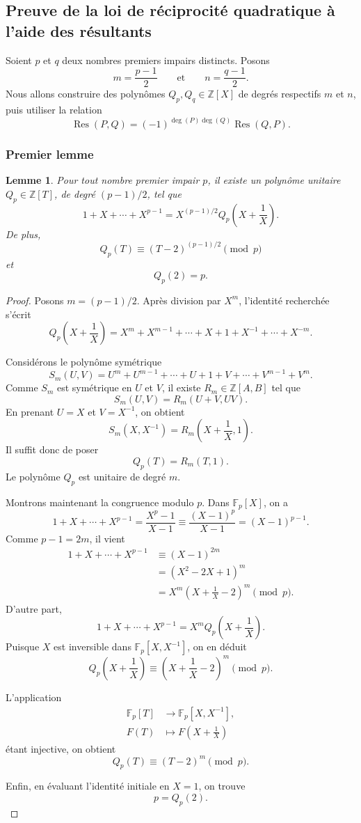 \documentclass[11pt,a4paper]{article}
\newtheorem{lemma}{Lemme}
\newcommand{\Res}{\operatorname{Res}}
\begin{document}
\subsection{Preuve de la loi de réciprocité quadratique à l'aide des résultants}

Soient \(p\) et \(q\) deux nombres premiers impairs distincts. Posons
\[
m=\frac{p-1}{2}
\qquad\text{et}\qquad
n=\frac{q-1}{2}.
\]
Nous allons construire des polynômes \(Q_p,Q_q\in\mathbb{Z}[X]\) de degrés
respectifs \(m\) et \(n\), puis utiliser la relation
\[
\Res(P,Q)
=
(-1)^{\deg(P)\deg(Q)}\Res(Q,P).
\]

\subsubsection{Premier lemme}

\begin{lemma}
Pour tout nombre premier impair \(p\), il existe un polynôme unitaire
\(Q_p\in\mathbb{Z}[T]\), de degré \((p-1)/2\), tel que
\[
1+X+\cdots+X^{p-1}
=
X^{(p-1)/2}Q_p\left(X+\frac{1}{X}\right).
\]
De plus,
\[
Q_p(T)\equiv (T-2)^{(p-1)/2}\pmod p
\]
et
\[
Q_p(2)=p.
\]
\end{lemma}

\begin{proof}
Posons \(m=(p-1)/2\). Après division par \(X^m\), l'identité recherchée
s'écrit
\[
Q_p\left(X+\frac{1}{X}\right)
=
X^m+X^{m-1}+\cdots+X+1
+X^{-1}+\cdots+X^{-m}.
\]

Considérons le polynôme symétrique
\[
S_m(U,V)
=
U^m+U^{m-1}+\cdots+U+1+V+\cdots+V^{m-1}+V^m.
\]
Comme \(S_m\) est symétrique en \(U\) et \(V\), il existe
\(R_m\in\mathbb{Z}[A,B]\) tel que
\[
S_m(U,V)=R_m(U+V,UV).
\]
En prenant \(U=X\) et \(V=X^{-1}\), on obtient
\[
S_m\left(X,X^{-1}\right)
=
R_m\left(X+\frac{1}{X},1\right).
\]
Il suffit donc de poser
\[
Q_p(T)=R_m(T,1).
\]
Le polynôme \(Q_p\) est unitaire de degré \(m\).

Montrons maintenant la congruence modulo \(p\). Dans
\(\mathbb{F}_p[X]\), on a
\[
1+X+\cdots+X^{p-1}
=
\frac{X^p-1}{X-1}
\equiv
\frac{(X-1)^p}{X-1}
=
(X-1)^{p-1}.
\]
Comme \(p-1=2m\), il vient
\begin{align*}
1+X+\cdots+X^{p-1}
&\equiv (X-1)^{2m} \\
&=(X^2-2X+1)^m \\
&=X^m\left(X+\frac{1}{X}-2\right)^m
\pmod p.
\end{align*}
D'autre part,
\[
1+X+\cdots+X^{p-1}
=
X^mQ_p\left(X+\frac{1}{X}\right).
\]
Puisque \(X\) est inversible dans
\(\mathbb{F}_p[X,X^{-1}]\), on en déduit
\[
Q_p\left(X+\frac{1}{X}\right)
\equiv
\left(X+\frac{1}{X}-2\right)^m
\pmod p.
\]

L'application
\[
\begin{aligned}
\mathbb{F}_p[T]&\longrightarrow\mathbb{F}_p[X,X^{-1}],\\
F(T)&\longmapsto F\left(X+\frac{1}{X}\right)
\end{aligned}
\]
étant injective, on obtient
\[
Q_p(T)\equiv(T-2)^m\pmod p.
\]

Enfin, en évaluant l'identité initiale en \(X=1\), on trouve
\[
p=Q_p(2).
\]
\end{proof}
\end{document}
